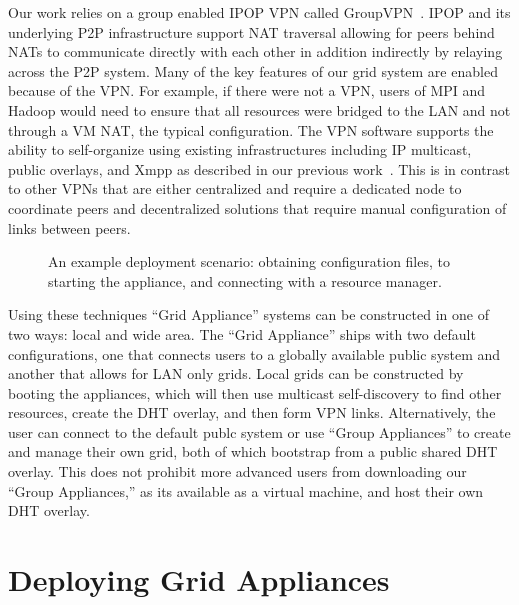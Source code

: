 \documentclass[conference]{IEEEtran}
\begin{document}
Our work relies on a group enabled IPOP VPN called GroupVPN~\cite{groupvpn}.
IPOP and its underlying P2P infrastructure support NAT traversal allowing for
peers behind NATs to communicate directly with each other in addition
indirectly by relaying across the P2P system.  Many of the key features of our
grid system are enabled because of the VPN.  For example, if there were not a
VPN, users of MPI and Hadoop would need to ensure that all resources were
bridged to the LAN and not through a VM NAT, the typical configuration.  The
VPN software supports the ability to self-organize using existing
infrastructures including IP multicast, public overlays, and Xmpp as described
in our previous work~\cite{p2p10}.  This is in contrast to other VPNs that are
either centralized and require a dedicated node to coordinate peers and
decentralized solutions that require manual configuration of links between
peers.

\begin{figure*}[ht]
\centering
{}
\caption{An example deployment scenario:  obtaining configuration files, to
starting the appliance, and connecting with a resource manager.}
\label{fig:system}
\end{figure*}

Using these techniques ``Grid Appliance'' systems can be constructed in one of
two ways: local and wide area.  The ``Grid Appliance'' ships with two default
configurations, one that connects users to a globally available public system
and another that allows for LAN only grids.  Local grids can be constructed by
booting the appliances, which will then use multicast self-discovery to find
other resources, create the DHT overlay, and then form VPN links.
Alternatively, the user can connect to the default publc system or use ``Group
Appliances'' to create and manage their own grid, both of which bootstrap from
a public shared DHT overlay.  This does not prohibit more advanced users from
downloading our ``Group Appliances,'' as its available as a virtual machine,
and host their own DHT overlay.

\section{Deploying Grid Appliances}
\label{system}
\end{document}
